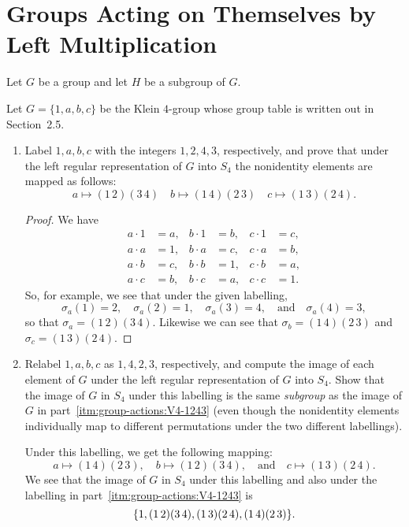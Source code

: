 \section[Groups Acting on Themselves by Left Mult.]
{Groups Acting on Themselves by Left Multiplication}

Let $G$ be a group and let $H$ be a subgroup of $G$.

 Let $G = \{1,a,b,c\}$ be the Klein $4$-group whose group
table is written out in Section~2.5.
\begin{enumerate}
\item \label{itm:group-actions:V4-1243}
  Label $1,a,b,c$ with the integers $1,2,4,3$, respectively, and prove
  that under the left regular representation of $G$ into $S_4$ the
  nonidentity elements are mapped as follows:
  \begin{equation*}
    a\mapsto(1\,2)(3\,4) \quad
    b\mapsto(1\,4)(2\,3) \quad
    c\mapsto(1\,3)(2\,4).
  \end{equation*}
  \begin{proof}
    We have
    \begin{align*}
      a\cdot1 &= a, & b\cdot1 &= b, & c\cdot1 &= c, \\
      a\cdot a &= 1, & b\cdot a &= c, & c\cdot a &= b, \\
      a\cdot b &= c, & b\cdot b &= 1, & c\cdot b &= a, \\
      a\cdot c &= b, & b\cdot c &= a, & c\cdot c &= 1.
    \end{align*}
    So, for example, we see that under the given labelling,
    \begin{equation*}
      \sigma_a(1) = 2, \quad
      \sigma_a(2) = 1, \quad
      \sigma_a(3) = 4, \quad\text{and}\quad
      \sigma_a(4) = 3,
    \end{equation*}
    so that $\sigma_a = (1\,2)(3\,4)$. Likewise we can see that
    $\sigma_b = (1\,4)(2\,3)$ and $\sigma_c = (1\,3)(2\,4)$.
  \end{proof}

\item Relabel $1,a,b,c$ as $1,4,2,3$, respectively, and compute the
  image of each element of $G$ under the left regular representation
  of $G$ into $S_4$. Show that the image of $G$ in $S_4$ under this
  labelling is the same {\em subgroup} as the image of $G$ in
  part~\ref{itm:group-actions:V4-1243} (even though the nonidentity
  elements individually map to different permutations under the two
  different labellings).
  \begin{solution}
    Under this labelling, we get the following mapping:
    \begin{equation*}
      a \mapsto (1\,4)(2\,3), \quad
      b \mapsto (1\,2)(3\,4), \quad\text{and}\quad
      c \mapsto (1\,3)(2\,4).
    \end{equation*}
    We see that the image of $G$ in $S_4$ under this labelling and
    also under the labelling in part~\ref{itm:group-actions:V4-1243}
    is
    \begin{equation*}
      \{1, (1\,2)(3\,4), (1\,3)(2\,4), (1\,4)(2\,3)\}. \qedhere
    \end{equation*}
  \end{solution}
\end{enumerate}

